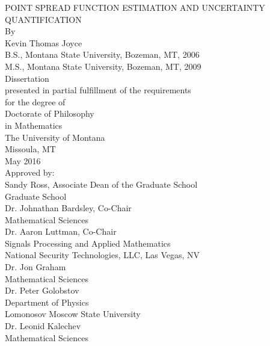 
\begin{titlepage}

\begin{center}
    \Large POINT SPREAD FUNCTION ESTIMATION AND UNCERTAINTY QUANTIFICATION\\ 
	\vspace{.5cm}
    \normalsize By\\
    \vspace{.5cm}
      Kevin Thomas Joyce\\
    \vspace{.5cm}
      B.S., Montana State University, Bozeman, MT, 2006\\ 
      M.S., Montana State University, Bozeman, MT, 2009\\   
    \vspace{.5cm}
	Dissertation\\
	\vspace{.5cm}
    presented in partial fulfillment of the requirements\\
    for the degree of\\
    \vspace{.5cm}
    Doctorate of Philosophy\\
	in Mathematics\\
    \vspace{.5cm}
    The University of Montana\\
	Missoula, MT\\
    \vspace{.5cm}
    May 2016\\
	\vspace{.5cm}
	Approved by:\\
	\vspace{.5cm}
	Sandy Ross, Associate Dean of the Graduate School\\  
	Graduate School\\
	\vspace{.5cm}
	Dr. Johnathan Bardsley, Co-Chair\\  
	Mathematical Sciences\\
	\vspace{.5cm}
	Dr. Aaron Luttman, Co-Chair\\  
	Signals Processing and Applied Mathematics\\
	National Security Technologies, LLC, Las Vegas, NV\\
	\vspace{.5cm}
	Dr. Jon Graham\\  
	Mathematical Sciences\\
	\vspace{.5cm}
	Dr. Peter Golobstov\\  
        Department of Physics\\
        Lomonosov Moscow State University\\
	\vspace{.5cm}
	Dr. Leonid Kalechev\\  
	Mathematical Sciences\\
\end{center}

\vspace{1.25in}


\pagebreak

\end{titlepage}
